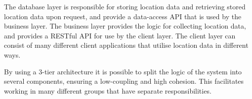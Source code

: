 The database layer is responsible for storing location data and retrieving stored location data upon request, and provide a data-access API that is used by the business layer. The business layer provides the logic for collecting location data, and provides a RESTful API for use by the client layer. The client layer can consist of many different client applications that utilise location data in different ways.

By using a 3-tier architecture it is possible to split the logic of the system into several components, ensuring a low-coupling and high cohesion. This facilitates working in many different groups that have separate responsibilities.
